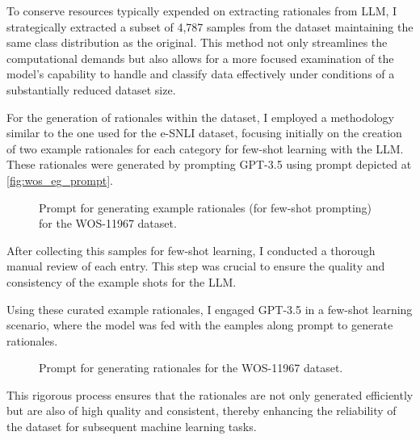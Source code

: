 To conserve resources typically expended on extracting rationales from LLM, I strategically extracted a subset of 4,787 samples from the dataset maintaining the same class distribution as the original. This method not only streamlines the computational demands but also allows for a more focused examination of the model's capability to handle and classify data effectively under conditions of a substantially reduced dataset size.

For the generation of rationales within the dataset, I employed a methodology similar to the one used for the e-SNLI dataset, focusing initially on the creation of two example rationales for each category for few-shot learning with the LLM\@. These rationales were generated by prompting GPT-3.5 using prompt depicted at \autoref{fig:wos_eg_prompt}.

\begin{figure}[ht!]
    \centering
    
    \caption{Prompt for generating example rationales (for few-shot prompting) for the WOS-11967 dataset.}
    \label{fig:wos_eg_prompt}
\end{figure}

After collecting this samples for few-shot learning, I conducted a thorough manual review of each entry. This step was crucial to ensure the quality and consistency of the example shots for the LLM\@.

Using these curated example rationales, I engaged GPT-3.5 in a few-shot learning scenario, where the model was fed with the eamples along prompt to generate rationales.

\begin{figure}[ht!]
    \centering
    
    \caption{Prompt for generating rationales for the WOS-11967 dataset.}
    \label{fig:wos_prompt}
\end{figure}

This rigorous process ensures that the rationales are not only generated efficiently but are also of high quality and consistent, thereby enhancing the reliability of the dataset for subsequent machine learning tasks.

